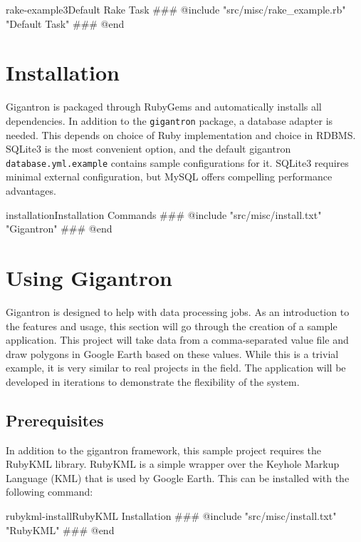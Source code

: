 \documentclass[12pt]{article}
\begin{document}
\begin{code}{rake-example3}{Default Rake Task}
### @include "src/misc/rake_example.rb" "Default Task"
### @end
\end{code}

\section*{Installation}

Gigantron is packaged through RubyGems and automatically installs all dependencies.  In addition to the \texttt{gigantron} package, a database adapter is needed.  This depends on choice of Ruby implementation and choice in RDBMS.  SQLite3 is the most convenient option, and the default gigantron \texttt{database.yml.example} contains sample configurations for it.  SQLite3 requires minimal external configuration, but MySQL offers compelling performance advantages.

\begin{code}{installation}{Installation Commands}
### @include "src/misc/install.txt" "Gigantron"
### @end
\end{code}

\section*{Using Gigantron}

Gigantron is designed to help with data processing jobs.  As an introduction to the features and usage, this section will go through the creation of a sample application.  This project will take data from a comma-separated value file and draw polygons in Google Earth based on these values. While this is a trivial example, it is very similar to real projects in the field.  The application will be developed in iterations to demonstrate the flexibility of the system.

\subsection*{Prerequisites}

In addition to the gigantron framework, this sample project requires the RubyKML library.  RubyKML is a simple wrapper over the Keyhole Markup Language (KML) that is used by Google Earth. This can be installed with the following command:

\begin{code}{rubykml-install}{RubyKML Installation}
### @include "src/misc/install.txt" "RubyKML"
### @end
\end{code}
\end{document}
